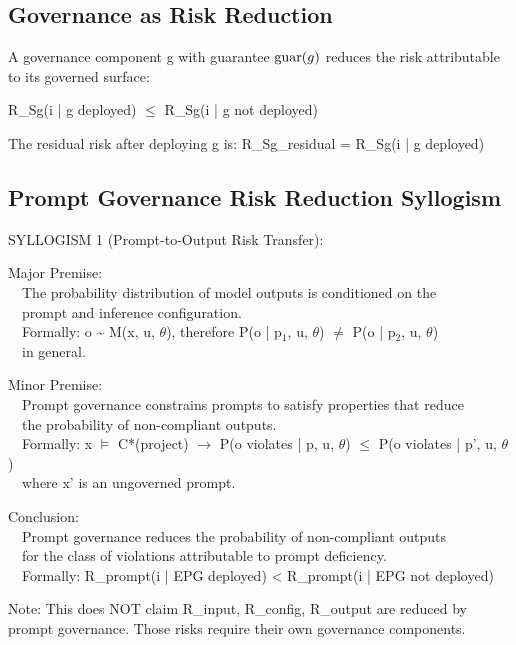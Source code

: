 \subsection{Governance as Risk Reduction}


\begin{cdef}
A governance component g with guarantee $\operatorname{guar}(g)$ reduces the risk attributable to its governed surface:

R\_\allowbreak{}Sg(i | g deployed) $\leq$ R\_\allowbreak{}Sg(i | g not deployed)

The residual risk after deploying g is: R\_\allowbreak{}Sg\_\allowbreak{}residual = R\_\allowbreak{}Sg(i | g deployed)

\end{cdef}


\subsection{Prompt Governance Risk Reduction Syllogism}


\begin{claddisp}
SYLLOGISM 1 (Prompt-to-Output Risk Transfer):
\par\smallskip
Major Premise:\\
~~The probability distribution of model outputs is conditioned on the\\
~~prompt and inference configuration.\\
~~Formally: o \textasciitilde{} M(x, u, $\theta$), therefore P(o | p$_1$, u, $\theta$) $\neq$ P(o | p$_2$, u, $\theta$)\\
~~in general.
\par\smallskip
Minor Premise:\\
~~Prompt governance constrains prompts to satisfy properties that reduce\\
~~the probability of non-compliant outputs.\\
~~Formally: x $\vDash$ C*(project) $\to$ P(o violates | p, u, $\theta$) $\leq$ P(o violates | p', u, $\theta$)\\
~~where x' is an ungoverned prompt.
\par\smallskip
Conclusion:\\
~~Prompt governance reduces the probability of non-compliant outputs\\
~~for the class of violations attributable to prompt deficiency.\\
~~Formally: R\_prompt(i | EPG deployed) < R\_prompt(i | EPG not deployed)
\par\smallskip
Note: This does NOT claim R\_input, R\_config, R\_output are reduced by\\
prompt governance. Those risks require their own governance components.
\end{claddisp}


